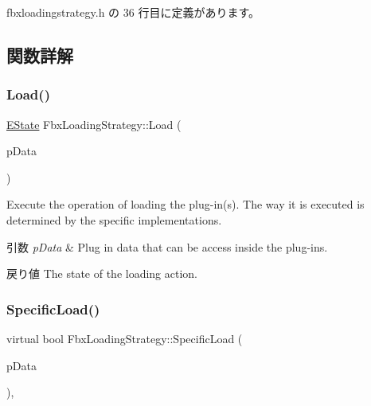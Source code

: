  fbxloadingstrategy.\+h の 36 行目に定義があります。



\subsection{関数詳解}
\mbox{\label{class_fbx_loading_strategy_a3923744db719aaebabe262e2e3891d8a}} 
\subsubsection{\texorpdfstring{Load()}{Load()}}
{\footnotesize\ttfamily \hyperlink{class_fbx_loading_strategy_a2f61523e78f4bb06d46ccf3351d2bcdb}{E\+State} Fbx\+Loading\+Strategy\+::\+Load (\begin{DoxyParamCaption}\item[{\hyperlink{struct_fbx_plugin_data}{Fbx\+Plugin\+Data} \&}]{p\+Data }\end{DoxyParamCaption})}

Execute the operation of loading the plug-\/in(s). The way it is executed is determined by the specific implementations. 
\begin{DoxyParams}{引数}
{\em p\+Data} & Plug in data that can be access inside the plug-\/ins. \\
\hline
\end{DoxyParams}
\begin{DoxyReturn}{戻り値}
The state of the loading action. 
\end{DoxyReturn}
\mbox{\label{class_fbx_loading_strategy_a5e1fb1dd165eeb5d4670aab41bed1659}} 
\subsubsection{\texorpdfstring{Specific\+Load()}{SpecificLoad()}}
{\footnotesize\ttfamily virtual bool Fbx\+Loading\+Strategy\+::\+Specific\+Load (\begin{DoxyParamCaption}\item[{\hyperlink{struct_fbx_plugin_data}{Fbx\+Plugin\+Data} \&}]{p\+Data }\end{DoxyParamCaption})\hspace{0.3cm}{\ttfamily [protected]}, {}}

